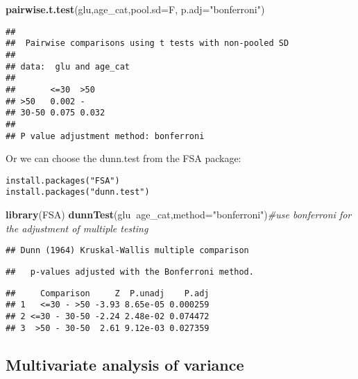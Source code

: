 \documentclass[]{book}
\newenvironment{Shaded}{\begin{snugshade}}{\end{snugshade}}
\newcommand{\KeywordTok}[1]{\textcolor[rgb]{0.13,0.29,0.53}{\textbf{#1}}}
\newcommand{\DataTypeTok}[1]{\textcolor[rgb]{0.13,0.29,0.53}{#1}}
\newcommand{\StringTok}[1]{\textcolor[rgb]{0.31,0.60,0.02}{#1}}
\newcommand{\CommentTok}[1]{\textcolor[rgb]{0.56,0.35,0.01}{\textit{#1}}}
\newcommand{\OperatorTok}[1]{\textcolor[rgb]{0.81,0.36,0.00}{\textbf{#1}}}
\newcommand{\NormalTok}[1]{#1}
\theoremstyle{definition}
\theoremstyle{definition}
\theoremstyle{definition}
\theoremstyle{remark}
\begin{document}
\begin{Shaded}
\begin{Highlighting}[]
\KeywordTok{pairwise.t.test}\NormalTok{(glu,age_cat,}\DataTypeTok{pool.sd=}\NormalTok{F, }\DataTypeTok{p.adj=}\StringTok{"bonferroni"}\NormalTok{)}
\end{Highlighting}
\end{Shaded}

\begin{verbatim}
## 
##  Pairwise comparisons using t tests with non-pooled SD 
## 
## data:  glu and age_cat 
## 
##       <=30  >50  
## >50   0.002 -    
## 30-50 0.075 0.032
## 
## P value adjustment method: bonferroni
\end{verbatim}

Or we can choose the dunn.test from the FSA package:

\begin{verbatim}
install.packages("FSA")
install.packages("dunn.test")
\end{verbatim}

\begin{Shaded}
\begin{Highlighting}[]
\KeywordTok{library}\NormalTok{(FSA)}
\KeywordTok{dunnTest}\NormalTok{(glu}\OperatorTok{~}\NormalTok{age_cat,}\DataTypeTok{method=}\StringTok{"bonferroni"}\NormalTok{)}\CommentTok{#use bonferroni for the adjustment of multiple testing}
\end{Highlighting}
\end{Shaded}

\begin{verbatim}
## Dunn (1964) Kruskal-Wallis multiple comparison
\end{verbatim}

\begin{verbatim}
##   p-values adjusted with the Bonferroni method.
\end{verbatim}

\begin{verbatim}
##     Comparison     Z  P.unadj    P.adj
## 1   <=30 - >50 -3.93 8.65e-05 0.000259
## 2 <=30 - 30-50 -2.24 2.48e-02 0.074472
## 3  >50 - 30-50  2.61 9.12e-03 0.027359
\end{verbatim}

\subsection{Multivariate analysis of
variance}\label{multivariate-analysis-of-variance}
\end{document}

